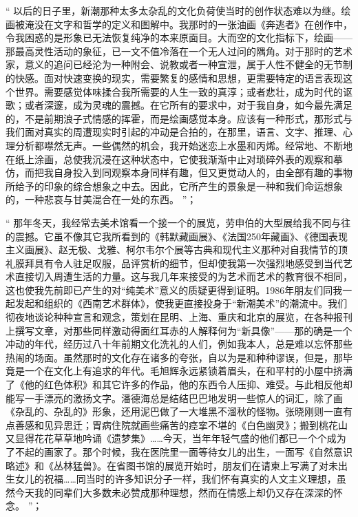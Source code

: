 \documentclass[master,oneside]{zjuthesis}
\begin{document}
“ 以后的日子里，新潮那种太多太杂乱的文化负荷使当时的创作状态难以为继。绘画被淹没在文字和哲学的定义和图解中。我那时的一张油画《奔逃者》在创作中，令我困惑的是形象已无法恢复纯净的本来原面目。大而空的文化指标下，绘画——那最高灵性活动的象征，已一文不值冷落在一个无人过问的隅角。对于那时的艺术家，意义的追问已经沦为一种附会、说教或者一种宣泄，属于人性不健全的无节制的快感。面对快速变换的现实，需要繁复的感情和思想，更需要特定的语言表现这个世界。需要感觉体味揉合我所需要的人生一致的真淳；或者悲壮，成为时代的讴歌；或者深邃，成为灵魂的震撼。在它所有的要求中，对于我自身，如今最先满足的，不是前期浪子式情感的挥霍，而是绘画感觉本身。应该有一种形式，那形式与我们面对真实的周遭现实时引起的冲动是合拍的，在那里，语言、文字、推理、心理分析都噤然无声。一些偶然的机会，我开始迷恋上水墨和丙烯。经常地、不断地在纸上涂画，总使我沉浸在这种状态中，它使我渐渐中止对琐碎外表的观察和摹仿，而把我自身投入到同观察本身同样有趣，但又更觉动人的，由全部有趣的事物所给予的印象的综合想象之中去。因此，它所产生的景象是一种和我们命运想象的，一种悲哀与甘美混合在一处的东西。 ”；

“ 那年冬天，我经常去美术馆看一个接一个的展览，劳申伯的大型展给我不同与往的震撼。它虽不像其它我所看到的《韩默藏画展》、《法国250年藏画》、《德国表现主义画展》、赵无极、戈雅、柯尔韦尔个展等古典和现代主义那种对自我情节的顶礼膜拜具有令人驻足叹服，品评赏析的细节，但却使我第一次强烈地感受到当代艺术直接切入周遭生活的力量。这与我几年来接受的为艺术而艺术的教育很不相同，这也使我先前即已产生的对“纯美术”意义的质疑更得到证明。1986年朋友们同我一起发起和组织的《西南艺术群体》，使我更直接投身于“新潮美术”的潮流中。我们彻夜地谈论种种宣言和观念，策划在昆明、上海、重庆和北京的展览，在各种报刊上撰写文章，对那些同样激动得面红耳赤的人解释何为“新具像”——那的确是一个冲动的年代，经历过八十年前期文化洗礼的人们，例如我本人，总是难以忘怀那些热闹的场面。虽然那时的文化存在诸多的夸张，自以为是和种种谬误，但是，那毕竟是一个在文化上有追求的年代。毛旭辉永远紧锁着眉头，在和平村的小屋中挤满了《他的红色体积》和其它许多的作品，他的东西令人压抑、难受。与此相反他却能写一手漂亮的激扬文字。潘德海总是结结巴巴地发明一些惊人的词汇，除了画《杂乱的、杂乱的》形象，还用泥巴做了一大堆黑不溜秋的怪物。张晓刚则一直有点善感和见异思迁；胃病住院就画些痛苦的痉挛不堪的《白色幽灵》；搬到桃花山又显得花花草草地吟诵《遗梦集》……今天，当年年轻气盛的他们都已一个个成为了不起的画家了。那个时候，我在医院里一面等待女儿的出生，一面写《自然意识略述》和《丛林猛兽》。在省图书馆的展览开始时，朋友们在请柬上写满了对未出生女儿的祝福……同当时的许多知识分子一样，我们怀有真实的人文主义理想，虽然今天我的同辈们大多数未必赞成那种理想，然而在情感上却仍又存在深深的怀念。 ”；
\end{document}
